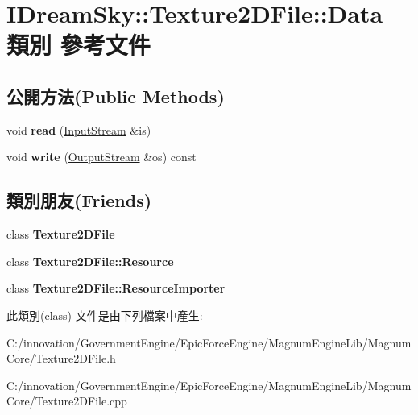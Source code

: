 \hypertarget{class_i_dream_sky_1_1_texture2_d_file_1_1_data}{}\section{I\+Dream\+Sky\+:\+:Texture2\+D\+File\+:\+:Data 類別 參考文件}
\label{class_i_dream_sky_1_1_texture2_d_file_1_1_data}
\subsection*{公開方法(Public Methods)}
\begin{DoxyCompactItemize}
\item 
void {\bfseries read} (\hyperlink{class_i_dream_sky_1_1_input_stream}{Input\+Stream} \&is)\hypertarget{class_i_dream_sky_1_1_texture2_d_file_1_1_data_a5c4ee0a563f8f83f37de677db17c5d2d}{}\label{class_i_dream_sky_1_1_texture2_d_file_1_1_data_a5c4ee0a563f8f83f37de677db17c5d2d}

\item 
void {\bfseries write} (\hyperlink{class_i_dream_sky_1_1_output_stream}{Output\+Stream} \&os) const \hypertarget{class_i_dream_sky_1_1_texture2_d_file_1_1_data_abd0731caf048b9dbe2cb7a5d3308c685}{}\label{class_i_dream_sky_1_1_texture2_d_file_1_1_data_abd0731caf048b9dbe2cb7a5d3308c685}

\end{DoxyCompactItemize}
\subsection*{類別朋友(Friends)}
\begin{DoxyCompactItemize}
\item 
class {\bfseries Texture2\+D\+File}\hypertarget{class_i_dream_sky_1_1_texture2_d_file_1_1_data_a78135ffc60f8c1be32a0f49fc97f9426}{}\label{class_i_dream_sky_1_1_texture2_d_file_1_1_data_a78135ffc60f8c1be32a0f49fc97f9426}

\item 
class {\bfseries Texture2\+D\+File\+::\+Resource}\hypertarget{class_i_dream_sky_1_1_texture2_d_file_1_1_data_aa240389cb83e3e814688791009b71c2c}{}\label{class_i_dream_sky_1_1_texture2_d_file_1_1_data_aa240389cb83e3e814688791009b71c2c}

\item 
class {\bfseries Texture2\+D\+File\+::\+Resource\+Importer}\hypertarget{class_i_dream_sky_1_1_texture2_d_file_1_1_data_addc15ea48fadfdc9672288b3cb2270b9}{}\label{class_i_dream_sky_1_1_texture2_d_file_1_1_data_addc15ea48fadfdc9672288b3cb2270b9}

\end{DoxyCompactItemize}


此類別(class) 文件是由下列檔案中產生\+:\begin{DoxyCompactItemize}
\item 
C\+:/innovation/\+Government\+Engine/\+Epic\+Force\+Engine/\+Magnum\+Engine\+Lib/\+Magnum\+Core/Texture2\+D\+File.\+h\item 
C\+:/innovation/\+Government\+Engine/\+Epic\+Force\+Engine/\+Magnum\+Engine\+Lib/\+Magnum\+Core/Texture2\+D\+File.\+cpp\end{DoxyCompactItemize}
